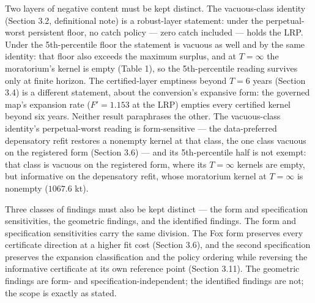 \documentclass[11pt]{article}
\begin{document}
Two layers of negative content must be kept distinct. The vacuous-class
identity (Section 3.2, definitional note) is a robust-layer statement:
under the perpetual-worst persistent floor, no catch policy --- zero
catch included --- holds the LRP. Under the 5th-percentile floor the
statement is vacuous as well and by the same identity: that floor also
exceeds the maximum surplus, and at \(T = \infty\) the moratorium's
kernel is empty (Table 1), so the 5th-percentile reading survives only
at finite horizon. The certified-layer emptiness beyond \(T = 6\) years
(Section 3.4) is a different statement, about the conversion's expansive
form: the governed map's expansion rate (\(F' = 1.153\) at the LRP)
empties every certified kernel beyond six years. Neither result
paraphrases the other. The vacuous-class
identity's perpetual-worst reading is form-sensitive --- the
data-preferred depensatory refit restores a nonempty kernel at that
class, the one class vacuous on the registered form (Section 3.6) ---
and its 5th-percentile half is not exempt: that class is vacuous on the
registered form, where its \(T = \infty\) kernels are empty, but
informative on the depensatory refit, whose moratorium kernel at
\(T = \infty\) is nonempty (\(1067.6\) kt).

Three classes of findings must also be kept distinct --- the form and
specification sensitivities, the geometric findings, and the identified
findings. The form and specification sensitivities carry the same
division. The Fox form preserves every certificate direction at a higher
fit cost (Section 3.6), and the second specification preserves the
expansion classification and the policy ordering while reversing the
informative certificate at its own reference point (Section 3.11). The
geometric findings are form- and specification-independent; the
identified findings are not; the scope is exactly as stated.
\end{document}
